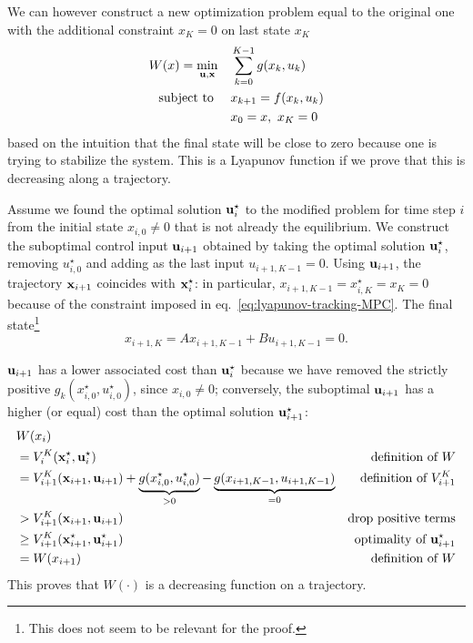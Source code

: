 We can however construct a new optimization problem equal to the original one with the additional constraint $x_K=0$ on last state $x_K$
\begin{equation}
  \label{eq:lyapunov-tracking-MPC}
  \begin{aligned}
    W(x) = \min_{\boldsymbol{\mathrm{u}},\boldsymbol{\mathrm{x}}} &\quad \sum_{k=0}^{K-1} g(x_k,u_k) \\
    \text{subject to } &\quad x_{k+1} = f(x_k,u_k) \\
                                            &\quad  x_0 = x,\ x_K = 0
  \end{aligned}
\end{equation}
based on the intuition that the final state will be close to zero because one is trying to stabilize the system. This is a Lyapunov function if we prove that this is decreasing along a trajectory.

Assume we found the optimal solution $\boldsymbol{\mathrm{u}}_i^\star$ to the modified problem for time step $i$ from the initial state $x_{i,0}\neq 0$ that is not already the equilibrium. We construct the suboptimal control input $\boldsymbol{\mathrm{u}}_{i+1}$ obtained by taking the optimal solution $\boldsymbol{\mathrm{u}}_i^\star$, removing $u_{i,0}^\star$ and adding as the last input $u_{i+1,K-1} = 0$. Using $\boldsymbol{\mathrm{u}}_{i+1}$, the trajectory $\boldsymbol{\mathrm{x}}_{i+1}$ coincides with $\boldsymbol{\mathrm{x}}_i^\star$: in particular, $x_{i+1,K-1}=x_{i,K}^\star=x_K=0$ because of the constraint imposed in eq.~\eqref{eq:lyapunov-tracking-MPC}. The final state\footnote{This does not seem to be relevant for the proof.}
\begin{equation*}
  x_{i+1,K} = Ax_{i+1,K-1}+Bu_{i+1,K-1} = 0.
\end{equation*}

$\boldsymbol{\mathrm{u}}_{i+1}$ has a lower associated cost than $\boldsymbol{\mathrm{u}}_i^\star$ because we have removed the strictly positive $g_k(x_{i,0}^\star,u_{i,0}^\star)$, since $x_{i,0}\neq 0$; conversely, the suboptimal $\boldsymbol{\mathrm{u}}_{i+1}$ has a higher (or equal) cost than the optimal solution $\boldsymbol{\mathrm{u}}_{i+1}^\star$:
\begin{align*}
  & W(x_i) \\
  & = V_i^K(\boldsymbol{\mathrm{x}}_i^\star, \boldsymbol{\mathrm{u}}_i^\star) & \text{definition of $W$} \\
  & = V_{i+1}^K(\boldsymbol{\mathrm{x}}_{i+1}, \boldsymbol{\mathrm{u}}_{i+1}) + \underbrace{g(x_{i,0}^\star,u_{i,0}^\star)}_{>0} - \underbrace{g(x_{i+1,K-1},u_{i+1,K-1})}_{=0} & \text{definition of $V_{i+1}^K$} \\
  & > V_{i+1}^K(\boldsymbol{\mathrm{x}}_{i+1}, \boldsymbol{\mathrm{u}}_{i+1}) & \text{drop positive terms} \\
  & \geq V_{i+1}^K(\boldsymbol{\mathrm{x}}_{i+1}^\star, \boldsymbol{\mathrm{u}}_{i+1}^\star) & \text{optimality of $\boldsymbol{\mathrm{u}}_{i+1}^\star$} \\
  & = W(x_{i+1}) & \text{definition of $W$}
\end{align*}
This proves that $W(\cdot)$ is a decreasing function on a trajectory.


